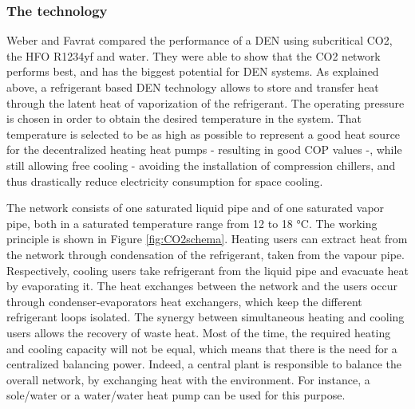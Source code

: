 \documentclass{article}
\begin{document}
\subsubsection{The technology}
Weber and Favrat \cite{weberConventionalAdvancedCO22010a} compared the performance of a DEN using subcritical CO2, the HFO R1234yf and water. They were able to show that the CO2 network performs best, and has the biggest potential for DEN systems\cite{henchozPotentialRefrigerantBased}. 
As explained above, a refrigerant based DEN technology allows to store and transfer heat through the latent heat of vaporization of the refrigerant. The operating pressure is chosen in order to obtain the desired temperature in the system. That temperature is selected to be as high as possible to represent a good heat source for the decentralized heating heat pumps - resulting in good COP values -, while still allowing free cooling - avoiding the installation of compression chillers, and thus drastically reduce electricity consumption for space cooling. 

The network consists of one saturated liquid pipe and of one saturated vapor pipe, both in a saturated temperature range from 12 to 18 \si{\celsius}\cite{suciuEnergyIntegrationCO22018}.
The working principle is shown in Figure \ref{fig:CO2schema}. Heating users can extract heat from the network through condensation of the refrigerant, taken from the vapour pipe. Respectively, cooling users take refrigerant from the liquid pipe and evacuate heat by evaporating it. The heat exchanges between the network and the users occur through condenser-evaporators heat exchangers, which keep the different refrigerant loops isolated\cite{henchozPotentialRefrigerantBased}. The synergy between simultaneous heating and cooling users allows the recovery of waste heat. Most of the time, the required heating and cooling capacity will not be equal, which means that there is the need for a centralized balancing power. Indeed, a central plant is responsible to balance the overall network, by exchanging heat with the environment. For instance, a sole/water or a water/water heat pump can be used for this purpose.\\

\end{document}
